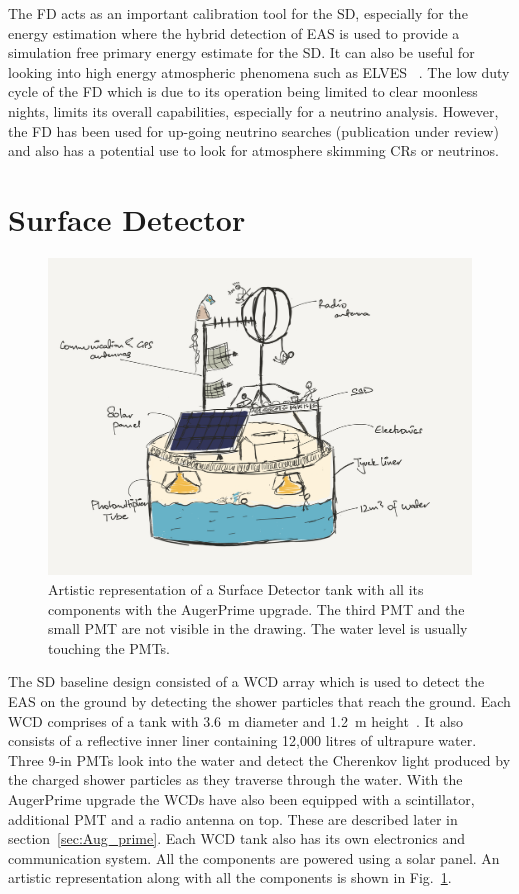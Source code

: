 The FD acts as an important calibration tool for the SD, especially for the energy estimation where the hybrid detection of EAS is used to provide a simulation free primary energy estimate for the SD. It can also be useful for looking into high energy atmospheric phenomena such as ELVES ~\cite{PierreAuger:2020lri}. The low duty cycle of the FD which is due to its operation being limited to clear moonless nights, limits its overall capabilities, especially for a neutrino analysis. However, the FD has been used for up-going neutrino searches (publication under review) and also has a potential use to look for atmosphere skimming CRs or neutrinos.  

\section{Surface Detector}
\label{sec:Sur_det}

\begin{figure}[h!]
  \centering
  \includegraphics[width=\textwidth]{thesis_figures/Setup/SD_tank_schematics_drawing.png}
  \caption{Artistic representation of a Surface Detector tank with all its components with the AugerPrime upgrade. The third PMT and the small PMT are not visible in the drawing. The water level is usually touching the PMTs.}
  \label{fig:SD_drawing}
  \end{figure}

The \gls*{SD} baseline design consisted of a \gls{WCD} array which is used to detect the EAS on the ground by detecting the shower particles that reach the ground. Each WCD comprises of a tank with 3.6 m diameter and 1.2 m height~\cite{PierreAuger:2007kus}. It also consists of a reflective inner liner containing 12,000 litres of ultrapure water. Three 9-in PMTs look into the water and detect the Cherenkov light produced by the charged shower particles as they traverse through the water. With the AugerPrime upgrade the WCDs have also been equipped with a scintillator, additional PMT and a radio antenna on top. These are described later in section~\ref{sec:Aug_prime}. Each WCD tank also has its own electronics and communication system. All the components are powered using a solar panel. An artistic representation along with all the components is shown in Fig.~\ref{fig:SD_drawing}. 

